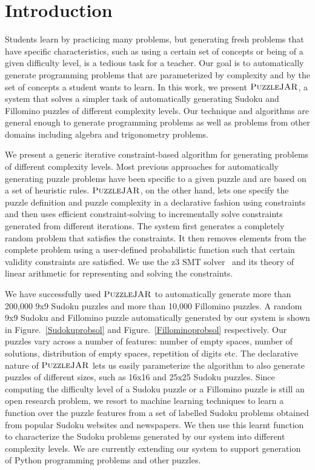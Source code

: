 \section{Introduction}

Students learn by practicing many problems, but generating fresh problems that have specific characteristics, such as using a certain set of concepts or being of a given difficulty level, is a tedious task for a teacher. Our goal is to automatically generate programming
problems that are parameterized by complexity and by the set of
concepts a student wants to learn. In this work, we present $\textsc{PuzzleJAR}$, a system
that solves a simpler task of automatically generating
Sudoku and Fillomino puzzles of different complexity levels. Our
technique and algorithms are general enough to generate programming
problems as well as problems from other domains including algebra and
trigonometry problems.

We present a generic iterative constraint-based algorithm for
generating problems of different complexity levels. Most previous
approaches for automatically generating puzzle problems have been
specific to a given puzzle and are based on a set of heuristic
rules. $\textsc{PuzzleJAR}$, on the other hand, lets one specify the puzzle
definition and puzzle complexity in a declarative fashion using
constraints and then uses efficient constraint-solving to
incrementally solve constraints generated from different
iterations. The system first generates a completely random problem
that satisfies the constraints. It then removes elements from the
complete problem using a user-defined probabilistic function such that
certain validity constraints are satisfied. We use the z3 SMT
solver~\cite{z3} and its theory of linear arithmetic for representing
and solving the constraints.

We have successfully used $\textsc{PuzzleJAR}$ to automatically generate more
than 200,000 9x9 Sudoku puzzles and more than 10,000 Fillomino
puzzles. A random 9x9 Sudoku and Fillomino puzzle automatically
generated by our system is shown in Figure.~\ref{Sudokuprobsol} and
Figure.~\ref{Fillominoprobsol} respectively. Our puzzles vary across a
number of features: number of empty spaces, number of solutions,
distribution of empty spaces, repetition of digits etc. The
declarative nature of $\textsc{PuzzleJAR}$ lets us easily parameterize the
algorithm to also generate puzzles of different sizes, such as 16x16
and 25x25 Sudoku puzzles. Since computing the difficulty level of a
Sudoku puzzle or a Fillomino puzzle is still an open research problem,
we resort to machine learning techniques to learn a function over the
puzzle features from a set of labelled Sudoku problems obtained from
popular Sudoku websites and newspapers. We then use this learnt
function to characterize the Sudoku problems generated by our system
into different complexity levels. We are currently extending our
system to support generation of Python programming problems and other
puzzles.

